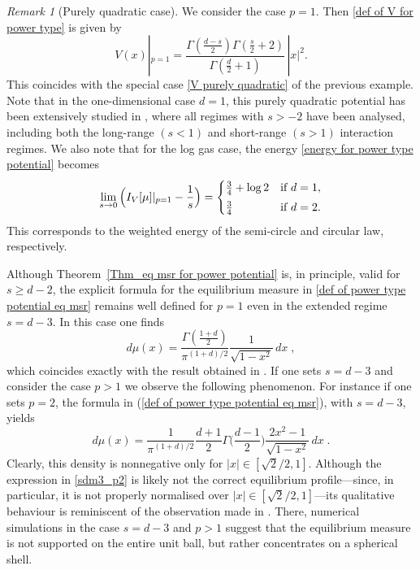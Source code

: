 \documentclass[10pt]{amsart}
\theoremstyle{plain}
\theoremstyle{remark}
\newtheorem{rem}{Remark}
\numberwithin{equation}{section}
\begin{document}
\begin{rem}[Purely quadratic case]
We consider the case $p=1$. Then \eqref{def of V for power type} is given by 
\begin{equation}
V(x)|_{p=1} =  \frac{ \Gamma(\frac{d-s}{2})  \Gamma(\frac{s}{2}+2)   }{ \Gamma(\frac{d}{2}+1)  } \,       |x|^{2}. 
\end{equation}
This coincides with the special case \eqref{V purely quadratic} of the previous example. Note that in the one-dimensional case $d=1$, this purely quadratic potential has been extensively studied in \cite{ADKKMMS19}, where all regimes with $s > -2$ have been analysed, including both the long-range $(s<1)$ and short-range $(s>1)$ interaction regimes. 
We also note that for the log gas case, the energy \eqref{energy for power type potential} becomes 
\begin{align}
\lim_{s\to0}\Big(I_V[\mu]|_{p=1}-\frac{1}{s}\Big)= \begin{cases}
\frac{3}{4}+\log 2  &\textup{if } d=1,
\smallskip 
\\
\frac34 &\textup{if } d=2. 
\end{cases} 
\end{align}
This corresponds to the weighted energy of the semi-circle and circular law, respectively. 

Although Theorem~\ref{Thm_eq msr for power potential} is, in principle, valid for $s \ge d-2$, the explicit formula for the equilibrium measure in \eqref{def of power type potential eq msr} remains well defined for $p=1$ even in the extended regime $s = d-3$. 
In this case one finds
\begin{equation}
 \label{sdm3}
d\mu(x) = \frac{\Gamma( \frac{1+d}{2} ) }{\pi^{(1+d)/2}} \frac{1}{\sqrt{1-x^2}} \,dx \;,
\end{equation} 
which coincides exactly with the result obtained in \cite{CSW22}. If one sets $s=d-3$ and consider the case $p>1$ we observe the following phenomenon. For instance if one sets $p=2$, the formula in (\ref{def of power type potential eq msr}), with $s=d-3$, yields
\begin{equation}
 \label{sdm3_p2}
d\mu(x) = \frac{1}{\pi^{(1+d)/2}} \frac{d+1}{2} \Gamma\Big( \frac{d-1}{2}\Big) \frac{2x^2-1}{\sqrt{1-x^2}} \,dx \;.
\end{equation} 
Clearly, this density is nonnegative only for $|x|\in[\sqrt{2}/2,1]$.
Although the expression in \eqref{sdm3_p2} is likely not the correct equilibrium profile---since, in particular, it is not properly normalised over $|x|\in[\sqrt{2}/2,1]$---its qualitative behaviour is reminiscent of the observation made in \cite[Section~2.1.3]{CSW23}. There, numerical simulations in the case $s=d-3$ and $p>1$ suggest that the equilibrium measure is not supported on the entire unit ball, but rather concentrates on a spherical shell. 
\end{rem}  
\end{document}
